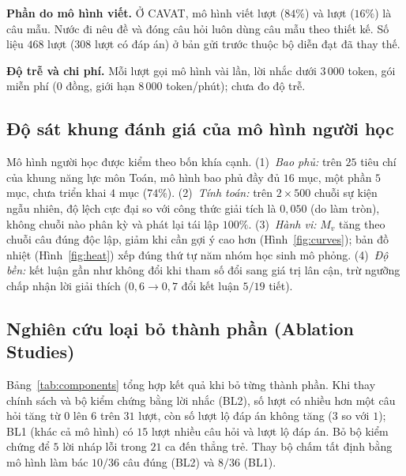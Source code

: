 \documentclass[10pt,a4paper,twocolumn]{article}
\begin{document}
\textbf{Phần do mô hình viết.} Ở CAVAT, mô hình viết \CavTurnsLLM{} lượt ($84\%$) và \CavTurnsTemplate{} lượt ($16\%$) là câu mẫu. Nước đi nêu đề và đóng câu hỏi luôn dùng câu mẫu theo thiết kế. Số liệu $468$ lượt ($308$ lượt có đáp án) ở bản gửi trước thuộc bộ diễn đạt đã thay thế.

\textbf{Độ trễ và chi phí.} Mỗi lượt gọi mô hình vài lần, lời nhắc dưới $3\,000$ token, gói miễn phí ($0$ đồng, giới hạn $8\,000$ token/phút); chưa đo độ trễ.

\subsection{Độ sát khung đánh giá của mô hình người học}
Mô hình người học được kiểm theo bốn khía cạnh. (1)~\emph{Bao phủ:} trên $25$ tiêu chí của khung năng lực môn Toán, mô hình bao phủ đầy đủ $16$ mục, một phần $5$ mục, chưa triển khai $4$ mục ($74\%$). (2)~\emph{Tính toán:} trên $2\times500$ chuỗi sự kiện ngẫu nhiên, độ lệch cực đại so với công thức giải tích là $0{,}050$ (do làm tròn), không chuỗi nào phân kỳ và phát lại tái lập $100\%$. (3)~\emph{Hành vi:} $M_v$ tăng theo chuỗi câu đúng độc lập, giảm khi cần gợi ý cao hơn (Hình~\ref{fig:curves}); bản đồ nhiệt (Hình~\ref{fig:heat}) xếp đúng thứ tự năm nhóm học sinh mô phỏng. (4)~\emph{Độ bền:} kết luận gần như không đổi khi tham số đổi sang giá trị lân cận, trừ ngưỡng chấp nhận lời giải thích ($0{,}6\to0{,}7$ đổi kết luận $5/19$ tiết).

\subsection{Nghiên cứu loại bỏ thành phần (Ablation Studies)}\label{sec:ablation}
Bảng~\ref{tab:components} tổng hợp kết quả khi bỏ từng thành phần. Khi thay chính sách và bộ kiểm chứng bằng lời nhắc (BL2), số lượt có nhiều hơn một câu hỏi tăng từ $0$ lên $6$ trên $31$ lượt, còn số lượt lộ đáp án không tăng ($3$ so với $1$); BL1 (khác cả mô hình) có $15$ lượt nhiều câu hỏi và \BoneLeaks{} lượt lộ đáp án. Bỏ bộ kiểm chứng để $5$ lời nháp lỗi trong $21$ ca đến thẳng trẻ. Thay bộ chấm tất định bằng mô hình làm bác $10/36$ câu đúng (BL2) và $8/36$ (BL1).
\end{document}
